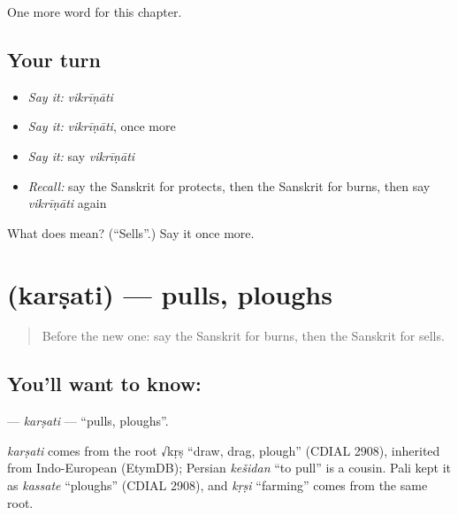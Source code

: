 \begin{grammarlens}[title={What you've built}]
One more word for this chapter.
\end{grammarlens}

\subsection*{Your turn}
\begin{itemize}
\raggedright
  \item \emph{Say it:} \emph{vikrīṇāti}
  \item \emph{Say it:} \emph{vikrīṇāti}, once more
  \item \emph{Say it:} say \emph{vikrīṇāti}
  \item \emph{Recall:} say the Sanskrit for protects, then the Sanskrit for burns, then say \emph{vikrīṇāti} again
\end{itemize}

\begin{tcolorbox}[breakable,colback=teal!4,colframe=teal!35!black,title={Before you move on}]
What does  mean? (\textquotedblleft{}Sells\textquotedblright{}.) Say it once more.
\end{tcolorbox}
\section[\texorpdfstring{\sk{कर्षति} (karṣati)}{कर्षति (karṣati)}]{ (karṣati) — pulls, ploughs}

\label{lesson:SA-C138-karsati}



\begin{quote}
Before the new one: say the Sanskrit for burns, then the Sanskrit for sells.
\end{quote}

\subsection*{You'll want to know: }
\textbf{} — \emph{karṣati} — \textquotedblleft{}pulls, ploughs\textquotedblright{}.

\begin{cousinweb}
\emph{karṣati} comes from the root √kṛṣ \textquotedblleft{}draw, drag, plough\textquotedblright{} (CDIAL 2908), inherited from Indo-European (EtymDB); Persian \emph{kešidan} \textquotedblleft{}to pull\textquotedblright{} is a cousin. Pali kept it as \emph{kassate} \textquotedblleft{}ploughs\textquotedblright{} (CDIAL 2908), and \emph{kṛṣi} \textquotedblleft{}farming\textquotedblright{} comes from the same root.
\end{cousinweb}

